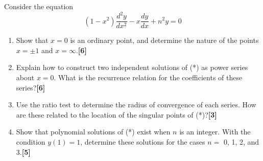 \documentclass[a4paper]{article}
\begin{document}
\newpage
\begin{qns}
Consider the equation
\begin{equation}
    (1-x^2)\frac{d^2y}{dx^2}-x\frac{dy}{dx}+n^2y=0\tag{*}
\end{equation}
\begin{enumerate}[label=(\alph*)]
\item Show that $x = 0$ is an ordinary point, and determine the nature of the points $x=\pm1$ and $x=\infty$.\hfill \textbf{[6]}
\item Explain how to construct two independent solutions of (*) as power series about $x = 0$. What is the recurrence relation for the coefficients of these series?\hfill \textbf{[6]}
\item Use the ratio test to determine the radius of convergence of each series. How are these related to the location of the singular points of (*)?\hfill \textbf{[3]}
\item Show that polynomial solutions of (*) exist when $n$ is an integer. With the condition $y(1) = 1$, determine these solutions for the cases $n =$ 0, 1, 2, and 3.\hfill \textbf{[5]}
\end{enumerate}
\end{qns}
\end{document}
